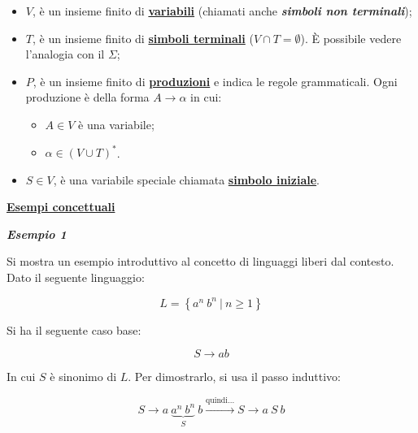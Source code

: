 \documentclass[a4paper]{article}
\begin{document}
	\begin{itemize}
	 	\item $V$, è un insieme finito di \textbf{\underline{variabili}} (chiamati anche \emph{\textbf{simboli non terminali}});
	 	
	 	\item $T$, è un insieme finito di \textbf{\underline{simboli terminali}} ($V \cap T = \emptyset$). È possibile vedere l'analogia con il $\Sigma$;
	 	
	 	\item $P$, è un insieme finito di \textbf{\underline{produzioni}} e indica le regole grammaticali. Ogni produzione è della forma $A \rightarrow \alpha$ in cui:
	 	\begin{itemize}
	 		\item $A \in V$ è una variabile;
	 		\item $\alpha \in \left(V \cup T\right)^{*}$.
	 	\end{itemize}
	 	
	 	\item $S \in V$, è una variabile speciale chiamata \textbf{\underline{simbolo iniziale}}.
	\end{itemize}

	\newpage

	\begin{center}
		\large
		\noindent
		\textcolor{Green4}{\textbf{\underline{Esempi concettuali}}}
	\end{center}

	\noindent
	\textcolor{Green4}{\textbf{\emph{Esempio 1}}}
	
	\noindent
	Si mostra un esempio introduttivo al concetto di linguaggi liberi dal contesto. Dato il seguente linguaggio:
	
	\begin{equation*}
		L = \left\{a^{n} \: b^{n} \: \left| \: n \ge 1 \right.\right\}
	\end{equation*}

	\noindent
	Si ha il seguente caso base:
	
	\begin{equation*}
		S \longrightarrow ab
	\end{equation*}

	\noindent
	In cui $S$ è sinonimo di $L$. Per dimostrarlo, si usa il passo induttivo:
	
	\begin{equation*}
		S \longrightarrow a \: \underbrace{a^{n} \: b^{n}}_{S} \: b \xrightarrow{\text{quindi...}} S \longrightarrow a \: S \: b
	\end{equation*}
\end{document}
